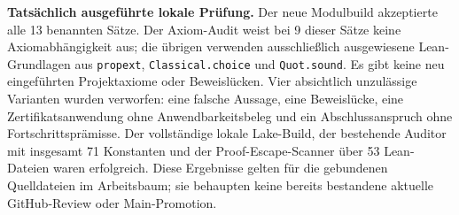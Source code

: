 \textbf{Tatsächlich ausgeführte lokale Prüfung.} Der neue Modulbuild akzeptierte alle 13 benannten Sätze. Der Axiom-Audit weist bei 9 dieser Sätze keine Axiomabhängigkeit aus; die übrigen verwenden ausschließlich ausgewiesene Lean-Grundlagen aus \texttt{propext}, \texttt{Classical.choice} und \texttt{Quot.sound}. Es gibt keine neu eingeführten Projektaxiome oder Beweislücken. Vier absichtlich unzulässige Varianten wurden verworfen: eine falsche Aussage, eine Beweislücke, eine Zertifikatsanwendung ohne Anwendbarkeitsbeleg und ein Abschlussanspruch ohne Fortschrittsprämisse. Der vollständige lokale Lake-Build, der bestehende Auditor mit insgesamt 71 Konstanten und der Proof-Escape-Scanner über 53 Lean-Dateien waren erfolgreich. Diese Ergebnisse gelten für die gebundenen Quelldateien im Arbeitsbaum; sie behaupten keine bereits bestandene aktuelle GitHub-Review oder Main-Promotion.
